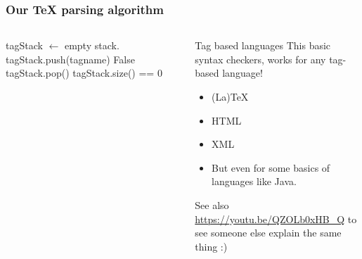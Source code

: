 \begin{frame}
	\frametitle{Our TeX parsing algorithm}
	\begin{columns}
	\begin{algorithmic}
		\State tagStack $\gets$ empty stack.
		\pause
				\State tagStack.push(tagname)
			\Else
		\pause
				\State \Return False
			\Else
				\State tagStack.pop()
			\EndIf
			\EndIf
		\EndWhile
		\pause
		\State \Return tagStack.size() == 0
	\end{algorithmic}
	\pause
			\begin{exampleblock}{Tag based languages}
				This basic syntax checkers, works for any tag-based language!
				\pause
				\begin{itemize}
					\item (La)TeX
					\item HTML
					\item XML
					\item But even for some basics of languages like Java.
				\end{itemize}
				\pause See also \url{https://youtu.be/QZOLb0xHB_Q} to see someone else explain the same thing :)
			\end{exampleblock}	
			
	\end{columns}
\end{frame}
